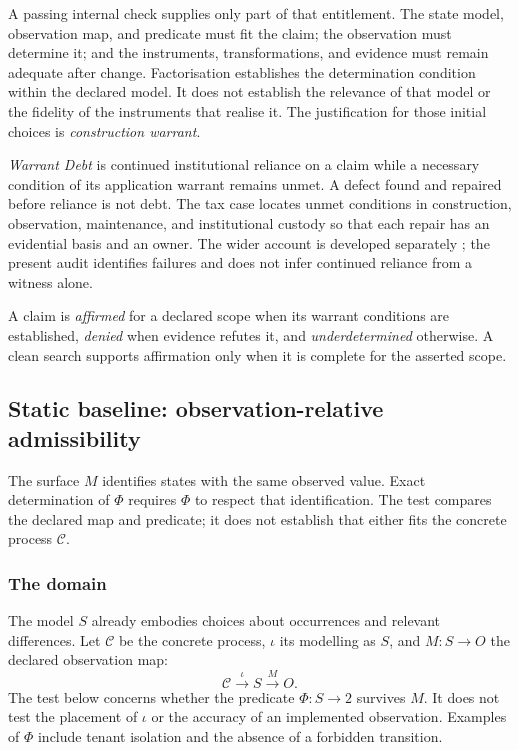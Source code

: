 \documentclass[smallextended,envcountsect,envcountsame,natbib]{svjour3}
\begin{document}
A passing internal check supplies only part of that entitlement. The state model, observation map, and predicate must fit the claim; the observation must determine it; and the instruments, transformations, and evidence must remain adequate after change. Factorisation establishes the determination condition within the declared model. It does not establish the relevance of that model or the fidelity of the instruments that realise it. The justification for those initial choices is \emph{construction warrant}.

\emph{Warrant Debt} is continued institutional reliance on a claim while a necessary condition of its application warrant remains unmet. A defect found and repaired before reliance is not debt. The tax case locates unmet conditions in construction, observation, maintenance, and institutional custody so that each repair has an evidential basis and an owner. The wider account is developed separately \citep{moore2026exactness}; the present audit identifies failures and does not infer continued reliance from a witness alone.

A claim is \emph{affirmed} for a declared scope when its warrant conditions are established, \emph{denied} when evidence refutes it, and \emph{underdetermined} otherwise. A clean search supports affirmation only when it is complete for the asserted scope.

\subsection{Static baseline: observation-relative admissibility}\label{ex:sec:test}

The surface $M$ identifies states with the same observed value. Exact determination of $\Phi$ requires $\Phi$ to respect that identification. The test compares the declared map and predicate; it does not establish that either fits the concrete process $\mathcal{C}$.

\subsubsection{The domain}

The model $S$ already embodies choices about occurrences and relevant differences. Let $\mathcal{C}$ be the concrete process, $\iota$ its modelling as $S$, and $M:S\to O$ the declared observation map:
\[
\mathcal{C} \overset{\iota}{\longrightarrow} S \overset{M}{\longrightarrow} O.
\]
The test below concerns whether the predicate $\Phi:S\to 2$ survives $M$. It does not test the placement of $\iota$ or the accuracy of an implemented observation. Examples of $\Phi$ include tenant isolation and the absence of a forbidden transition.
\end{document}
